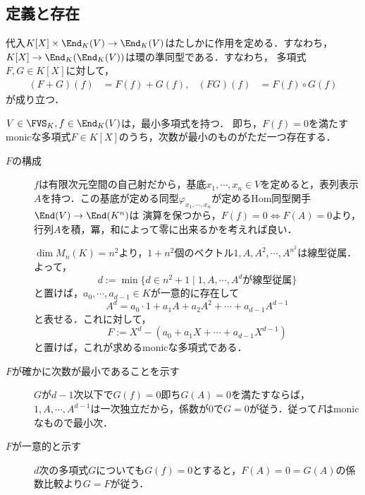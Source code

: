 \documentclass[uplatex, dvipdfmx]{jsreport}
\begin{document}
\subsection{定義と存在}

\begin{proposition}\label{prop-functoriality-of-substitution}
    代入$K[X]\times\End_K(V)\to\End_K(V)$はたしかに作用を定める．すなわち，
    $K[X]\to\End_K(\End_K(V))$は環の準同型である．すなわち，
    多項式$F,G\in K[X]$に対して，
    \begin{align*}
        (F+G)(f)&=F(f)+G(f),&(FG)(f)&=F(f)\circ G(f)
    \end{align*}
    が成り立つ．
\end{proposition}

\begin{proposition}[有限次元線型空間の自己射は必ず最小多項式を持つ]\label{prop-existence-of-minimal-polynomial}
    $V\in\FVS_K,f\in\End_K(V)$は，最小多項式を持つ．
    即ち，$F(f)=0$を満たすmonicな多項式$F\in K[X]$のうち，次数が最小のものがただ一つ存在する．
\end{proposition}
\begin{Proof}
    \begin{description}
        \item[$F$の構成] $f$は有限次元空間の自己射だから，基底$x_1,\cdots,x_n\in V$を定めると，表列表示$A$を持つ．この基底が定める同型$\varphi_{x_1,\cdots,x_n}$が定めるHom同型関手$\End(V)\to\End(K^n)$は
        演算を保つから，$F(f)=0\Leftrightarrow F(A)=0$より，行列$A$を積，冪，和によって零に出来るかを考えれば良い．

        $\dim M_n(K)=n^2$より，$1+n^2$個のベクトル$1,A,A^2,\cdots,A^{n^2}$は線型従属．
        よって，
        \[ d:=\min\{d\in n^2+1\mid 1,A,\cdots,A^dが線型従属\} \]
        と置けば，$a_0,\cdots,a_{d-1}\in K$が一意的に存在して
        \[ A^d=a_0\cdot 1+a_1A+a_2A^2+\cdots+a_{d-1}A^{d-1} \]
        と表せる．これに対して，
        \[ F:=X^d-(a_0+a_1X+\cdots+a_{d-1}X^{d-1}) \]
        と置けば，これが求めるmonicな多項式である．
        \item[$F$が確かに次数が最小であることを示す] $G$が$d-1$次以下で$G(f)=0$即ち$G(A)=0$を満たすならば，$1,A,\cdots,A^{d-1}$は一次独立だから，係数が$0$で$G=0$が従う．従って$F$はmonicなもので最小次．
        \item[$F$が一意的と示す] $d$次の多項式$G$についても$G(f)=0$とすると，$F(A)=0=G(A)$の係数比較より$G=F$が従う．
    \end{description}
\end{Proof}
\end{document}
